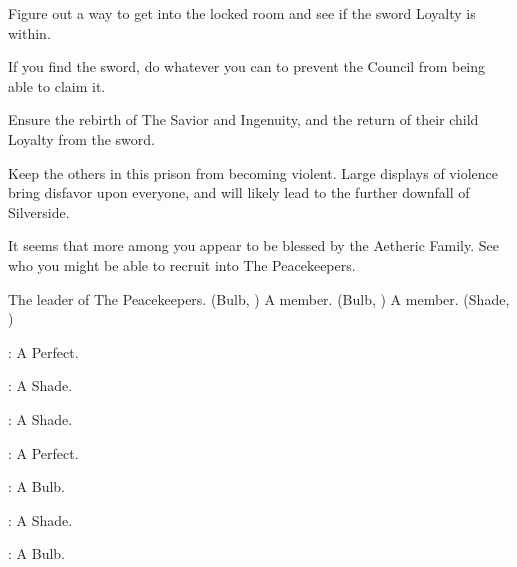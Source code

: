 \documentclass[blue]{Silversiders}
\begin{document}
\begin{itemz}[Goals]
  \item Figure out a way to get into the locked room and see if the sword Loyalty is within.
  \item If you find the sword, do whatever you can to prevent the Council from being able to claim it.
  \item Ensure the rebirth of The Savior and Ingenuity, and the return of their child Loyalty from the sword.
  \item Keep the others in this prison from becoming violent. Large displays of violence bring disfavor upon everyone, and will likely lead to the further downfall of Silverside.
  \item It seems that more among you appear to be blessed by the Aetheric Family. See who you might be able to recruit into The Peacekeepers.
\end{itemz}

\begin{members}
	\member{\cCaregiver{}} The leader of The Peacekeepers. (Bulb, \cCaregiver{\Sex})
	\member{\cBeauty{}} A member. (Bulb, \cBeauty{\Sex})
	\member{\cTraitor{}} A member. (Shade, \cTraitor{\Sex})
	
\end{members}

\begin{itemz}
	\item \cTruth{}: A \cTruth{\sex} Perfect.
	\item \cWisdom{}: A \cWisdom{\sex} Shade.
	\item \cLove{}: A \cLove{\sex} Shade.
	\item \cFamine{}: A \cFamine{\sex} Perfect.
	\item \cOutcast{}: A \cOutcast{\sex} Bulb.
	\item \cIngenuity{}: A \cIngenuity{\sex} Shade.
	\item \cHonor{}: A \cHonor{\sex} Bulb.

\end{itemz}
\end{document}
